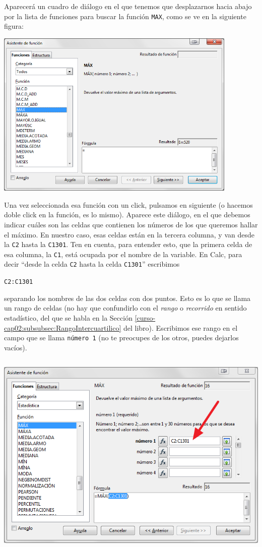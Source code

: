 \documentclass[10pt,a4paper]{article}\usepackage[]{graphicx}\usepackage[]{color}
\newcounter {cont01}
\begin{document}
Aparecerá un cuadro de diálogo en el que tenemos que desplazarnos hacia abajo por la lista de funciones para buscar la función {\tt MAX}, como se ve en la siguiente figura:
    \begin{center}
    \includegraphics[height=8cm]{../fig/Tut01-Calc-tablaFrec-04.png}
    \end{center}
Una vez seleccionada esa función con un click, pulsamos en siguiente (o hacemos doble click en la función, es lo mismo). Aparece este diálogo, en el que debemos indicar cuáles son las celdas que contienen los números de los que queremos hallar el máximo. En nuestro caso, esas celdas están en la tercera columna, y van desde la {\tt C2} hasta la {\tt C1301}. Ten en cuenta, para entender esto, que la primera celda de esa columna, la {\tt C1},  está ocupada por el nombre de la variable. En Calc, para decir ``desde la celda {\tt C2} hasta la celda {\tt C1301}'' escribimos
    \begin{center}{\tt C2:C1301}\end{center}
separando los nombres de las dos celdas con dos puntos. Esto es lo que se llama un {\sf rango} de celdas (no hay que confundirlo con el {\em rango} o {\em recorrido} en sentido estadístico, del que se habla en la Sección \ref{curso-cap02:subsubsec:RangoIntercuartilico} del libro). Escribimos ese rango en el campo que se llama {\tt número 1} (no te preocupes de los otros, puedes dejarlos vacíos).
    \begin{center}
    \includegraphics[height=10cm]{../fig/Tut01-Calc-tablaFrec-05.png}
    \end{center}
\end{document}
